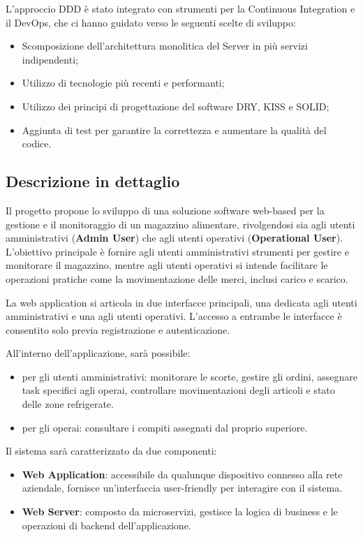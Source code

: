 L'approccio DDD è stato integrato con strumenti per la Continuous Integration e il DevOps, che ci hanno guidato verso le seguenti scelte di sviluppo:
\begin{itemize}
    \item Scomposizione dell’architettura monolitica del Server in più servizi indipendenti;
    \item Utilizzo di tecnologie più recenti e performanti;
    \item Utilizzo dei principi di progettazione del software DRY, KISS e SOLID;
    \item Aggiunta di test per garantire la correttezza e aumentare la qualità del codice.
\end{itemize}
\newpage
\subsection{Descrizione in dettaglio}

Il progetto propone lo sviluppo di una soluzione software web-based per la gestione e il monitoraggio di un magazzino alimentare, rivolgendosi sia agli utenti amministrativi (\textbf{Admin User}) che agli utenti operativi (\textbf{Operational User}). L'obiettivo principale è fornire agli utenti amministrativi strumenti per gestire e monitorare il magazzino, mentre agli utenti operativi si intende facilitare le operazioni pratiche come la movimentazione delle merci, inclusi carico e scarico.

La web application si articola in due interfacce principali, una dedicata agli utenti amministrativi e una agli utenti operativi. L'accesso a entrambe le interfacce è consentito solo previa registrazione e autenticazione.

All'interno dell'applicazione, sarà possibile:
\begin{itemize}
    \item per gli utenti amministrativi: monitorare le scorte, gestire gli ordini, assegnare task specifici agli operai, controllare movimentazioni degli articoli e stato delle zone refrigerate.
    \item per gli operai: consultare i compiti assegnati dal proprio superiore.
\end{itemize}

Il sistema sarà caratterizzato da due componenti:
\begin{itemize}
    \item \textbf{Web Application}: accessibile da qualunque dispositivo connesso alla rete aziendale, fornisce un'interfaccia user-friendly per interagire con il sistema.
    \item \textbf{Web Server}: composto da microservizi, gestisce la logica di business e le operazioni di backend dell'applicazione.
\end{itemize}
\newpage